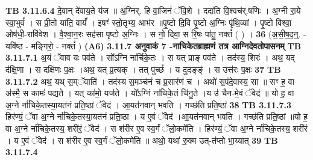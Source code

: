 \documentclass[17pt]{extarticle}
\begin{document}
{{{{{{{{{{{{{{{{{{{{{{                  \newline
                                \textbf{ TB 3.11.6.4} \newline
                  दे॒वान् दे॑वाय॒ते य॑ज ॥ अ॒ग्निर्. हि वा॒जिनं॑ ॅवि॒शे । ददा॑ति वि॒श्वच॑र्.षणिः । अ॒ग्नी रा॒ये स्वा॒भुवं᳚ । स प्री॒तो या॑ति॒ वार्यं᳚ । इषꣳ॑ स्तो॒तृभ्य॒ आभ॑र ॥पृ॒ष्टो दि॒वि पृ॒ष्टो अ॒ग्निः पृ॑थि॒व्यां । पृ॒ष्टो विश्वा॒ ओष॑धी॒-रावि॑वेश । वै॒श्वा॒न॒रः सह॑सा पृ॒ष्टो अ॒ग्निः । स नो॒ दिवा॒ स रि॒षः पा॑तु॒ नक्तं᳚ ( ) । \textbf{ 36} \newline
                  \newline
                                    (अ॒सी॒ष॒द॒न्॒. - यवि॑ष्ठ - मङ्गिरो॒ - नक्तं᳚ ) \textbf{(A6)} \newline \newline
                \textbf{ 3.11.7    अनुवाकं   7 -नाचिकेतब्राह्मणं तत्र आग्निदेवतोपासनम्} \newline
                                \textbf{ TB 3.11.7.1} \newline
                  अ॒यं ॅवाव यः पव॑ते । सो᳚ऽग्नि ना॑र्चिके॒तः । स यत् प्राङ् पव॑ते । तद॑स्य॒ शिरः॑ । अथ॒ यद् द॑क्षि॒णा । स दक्षि॑णः प॒क्षः ।अथ॒ यत् प्र॒त्यक् । तत् पुच्छं᳚ । य दुदङ्ङ्॑ । स उत्त॑रः प॒क्षः \textbf{ 37} \newline
                  \newline
                                \textbf{ TB 3.11.7.2} \newline
                  अथ॒ यथ् स॒म्ॅवाति॑ । तद॑स्य स॒मञ्च॑नं च प्र॒सार॑णं च । अथो॑ स॒पंदे॒वास्य॒ सा ॥ सꣳ ह॒ वा अ॑स्मै॒ स कामः॑ पद्यते । यत् का॑मो॒ यज॑ते । यो᳚ऽग्निं ना॑चिके॒तं चि॑नु॒ते ।य उ॑ चैन-मे॒वं ॅवेद॑ ॥ यो ह॒ वा अ॒ग्ने र्ना॑चिके॒तस्या॒यत॑नं प्रति॒॒ष्ठां ॅवेद॑ । आ॒यत॑नवान् भवति । गच्छ॑ति प्रति॒ष्ठां \textbf{ 38} \newline
                  \newline
                                \textbf{ TB 3.11.7.3} \newline
                  हिर॑ण्यं॒ ॅवा अ॒ग्ने र्ना॑चिके॒तस्या॒यत॑नं प्रति॒ष्ठा । य ए॒वं ॅवेद॑ ।आ॒यत॑नवान् भवति । गच्छ॑ति प्रति॒ष्ठां ॥यो ह॒ वा अ॒ग्ने र्ना॑चिके॒तस्य॒ शरी॑रं॒ ॅवेद॑ । स श॑रीर ए॒व स्व॒र्गं ॅलो॒कमे॑ति । हिर॑ण्यं॒ ॅवा अ॒ग्ने र्ना॑चिके॒तस्य॒ शरी॑रं । य ए॒वं ॅवेद॑ । स श॑रीर ए॒व स्व॒र्गं ॅलो॒कमे॑ति ॥ अथो॒ यथा॑ रु॒क्म उत्-त॑प्तो भा॒य्यात् \textbf{ 39} \newline
                  \newline
                                \textbf{ TB 3.11.7.4} \newline
}}}}}}}}}}}}}}}}}}}}}}
\end{document}
